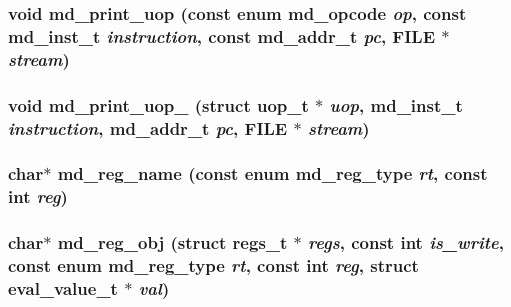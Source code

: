 \subsubsection[{md\_\-print\_\-uop}]{\setlength{\rightskip}{0pt plus 5cm}void md\_\-print\_\-uop (const enum {\bf md\_\-opcode} {\em op}, \/  const {\bf md\_\-inst\_\-t} {\em instruction}, \/  const {\bf md\_\-addr\_\-t} {\em pc}, \/  FILE $\ast$ {\em stream})}\label{machine_8h_909d178c8e7895b5c100a7a3ddfc4bf9}


\subsubsection[{md\_\-print\_\-uop\_\-1}]{\setlength{\rightskip}{0pt plus 5cm}void md\_\-print\_\-uop\_ (struct {\bf uop\_\-t} $\ast$ {\em uop}, \/  {\bf md\_\-inst\_\-t} {\em instruction}, \/  {\bf md\_\-addr\_\-t} {\em pc}, \/  FILE $\ast$ {\em stream})}\label{machine_8h_0e431a2ec90a48c9be48b16fe4b27308}


\subsubsection[{md\_\-reg\_\-name}]{\setlength{\rightskip}{0pt plus 5cm}char$\ast$ md\_\-reg\_\-name (const enum {\bf md\_\-reg\_\-type} {\em rt}, \/  const int {\em reg})}\label{machine_8h_23de52be525515e7ed07747171d4b9f2}


\subsubsection[{md\_\-reg\_\-obj}]{\setlength{\rightskip}{0pt plus 5cm}char$\ast$ md\_\-reg\_\-obj (struct {\bf regs\_\-t} $\ast$ {\em regs}, \/  const int {\em is\_\-write}, \/  const enum {\bf md\_\-reg\_\-type} {\em rt}, \/  const int {\em reg}, \/  struct {\bf eval\_\-value\_\-t} $\ast$ {\em val})}\label{machine_8h_fa935106d254788ae71585b12ca3513f}


